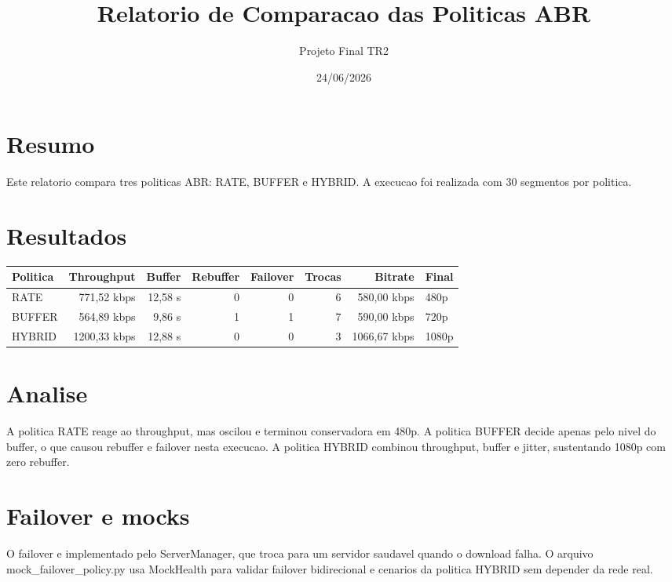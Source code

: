 \documentclass[12pt,a4paper]{article}
\title{Relatorio de Comparacao das Politicas ABR}
\author{Projeto Final TR2}
\date{24/06/2026}
\begin{document}
\maketitle

\section{Resumo}
Este relatorio compara tres politicas ABR: RATE, BUFFER e HYBRID. A execucao foi realizada com 30 segmentos por politica.

\section{Resultados}
\begin{tabular}{lrrrrrrl}
\toprule
Politica & Throughput & Buffer & Rebuffer & Failover & Trocas & Bitrate & Final\\
\midrule
RATE & 771,52 kbps & 12,58 s & 0 & 0 & 6 & 580,00 kbps & 480p\\
BUFFER & 564,89 kbps & 9,86 s & 1 & 1 & 7 & 590,00 kbps & 720p\\
HYBRID & 1200,33 kbps & 12,88 s & 0 & 0 & 3 & 1066,67 kbps & 1080p\\
\bottomrule
\end{tabular}

\section{Analise}
A politica RATE reage ao throughput, mas oscilou e terminou conservadora em 480p. A politica BUFFER decide apenas pelo nivel do buffer, o que causou rebuffer e failover nesta execucao. A politica HYBRID combinou throughput, buffer e jitter, sustentando 1080p com zero rebuffer.

\section{Failover e mocks}
O failover e implementado pelo ServerManager, que troca para um servidor saudavel quando o download falha. O arquivo mock_failover_policy.py usa MockHealth para validar failover bidirecional e cenarios da politica HYBRID sem depender da rede real.
\end{document}
